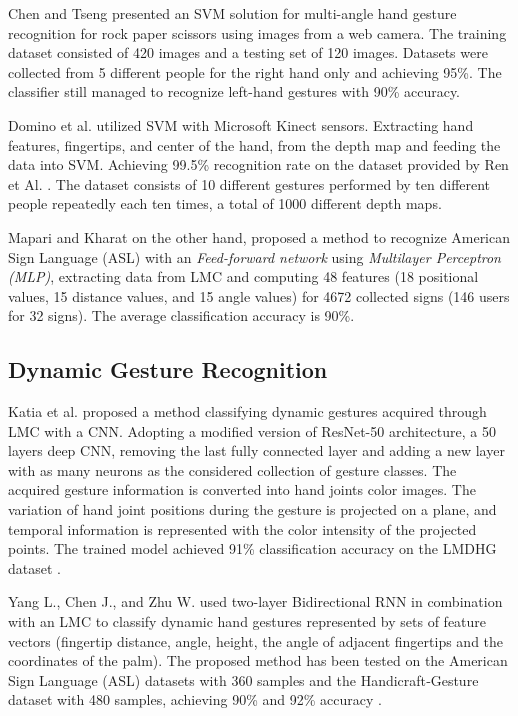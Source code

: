 Chen and Tseng \cite{chentseng} presented an SVM solution for multi-angle hand gesture recognition for rock paper scissors using images from a web camera. The training dataset consisted of 420 images and a testing set of 120 images. 
Datasets were collected from 5 different people for the right hand only and achieving 95\%. The classifier still managed to recognize left-hand gestures with 90\% accuracy. 

Domino et al. \cite{dominokinect} utilized SVM with Microsoft Kinect sensors. Extracting hand features, fingertips, and center of the hand, from the depth map and feeding the data into SVM. Achieving 99.5\% recognition rate on the dataset provided by Ren et Al. \cite{dominokinect_data}. The dataset consists of 10 different gestures performed by ten different people repeatedly each ten times, a total of 1000 different depth maps.

Mapari and Kharat \cite{mapari} on the other hand, proposed a method to recognize American Sign Language (ASL) with an \textit{Feed-forward network} using \textit{Multilayer Perceptron (MLP)}, extracting data from LMC and computing 48 features (18 positional values, 15 distance values, and 15 angle values) for 4672 collected signs (146 users for 32 signs). The average classification accuracy is 90\%.

\subsection{Dynamic Gesture Recognition}

Katia et al. \cite{katiacnn} proposed a method classifying dynamic gestures acquired through LMC with a CNN.
Adopting a modified version of ResNet-50 architecture, a 50 layers deep CNN, removing the last fully connected layer and adding a new layer with as many neurons as the considered collection of gesture classes. 
The acquired gesture information is converted into hand joints color images. The variation of hand joint positions during the gesture is projected on a plane, and temporal information is represented with the color intensity of the projected points. The trained model achieved 91\% classification accuracy on the LMDHG dataset \cite{lmdhg}.

Yang L., Chen J., and Zhu W. \cite{bidirect_dynam} used two-layer Bidirectional RNN in combination with an LMC to classify dynamic hand gestures represented by sets of feature vectors (fingertip distance, angle, height, the angle of adjacent fingertips and the coordinates of the palm). The proposed method has been tested on the American Sign Language (ASL) datasets with 360 samples and the Handicraft‐Gesture dataset with 480 samples, achieving 90\% and 92\% accuracy \cite{bidirect_dynam}.

